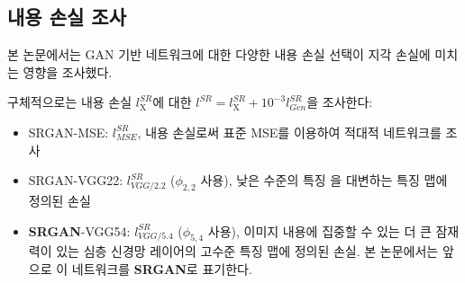 \documentclass[10pt,twocolumn,letterpaper]{article}
\newcommand{\kor}[1]{#1}
\newcommand{\eng}[1]{}
\newcommand{\summary}[1]{}
\begin{document}
\subsection{\eng{Investigation of content loss}\kor{내용 손실 조사}}
\eng{
We investigated the effect of different content loss choices in the perceptual loss for the \ac{GAN}-based networks.
}\kor{
본 논문에서는 \ac{GAN} 기반 네트워크에 대한 다양한 내용 손실 선택이 지각 손실에 미치는 영향을 조사했다.
} \eng{
Specifically we investigate $l^{SR} = l^{SR}_\textrm{X} + 10^{-3}l^{SR}_{Gen}$ for the following content losses $l^{SR}_\textrm{X}$:\\
}\kor{
구체적으로는 내용 손실 $l^{SR}_\textrm{X}$에 대한 $l^{SR} = l^{SR}_\textrm{X} + 10^{-3}l^{SR}_{Gen}$을 조사한다:\\
}
\begin{itemize}
\item \eng{
SRGAN-MSE: $l^{SR}_{MSE}$, to investigate the adversarial network with the standard \ac{MSE} as content loss.
}\kor{
SRGAN-MSE: $l^{SR}_{MSE}$, 내용 손실로써 표준 \ac{MSE}를 이용하여 적대적 네트워크를 조사
}
\item \eng{
SRGAN-VGG22: $l^{SR}_{VGG/2.2}$ with $\phi_{2,2}$, a loss defined on feature maps representing lower-level features \cite{zeiler2014visualizing}.
}\kor{
SRGAN-VGG22: $l^{SR}_{VGG/2.2}$ ($\phi_{2,2}$ 사용), 낮은 수준의 특징 \cite{zeiler2014visualizing}을 대변하는 특징 맵에 정의된 손실
}
\item \eng{
\textbf{SRGAN}-VGG54: $l^{SR}_{VGG/5.4}$ with $\phi_{5,4}$, a loss defined on feature maps of higher level features from deeper network layers with more potential to focus on the content of the images \cite{zeiler2014visualizing,Yosinski2015,Mahendran2016}. We refer to this network as \textbf{SRGAN} in the following.
}\kor{
\textbf{SRGAN}-VGG54: $l^{SR}_{VGG/5.4}$ ($\phi_{5,4}$ 사용), 이미지 내용에 집중할 수 있는 더 큰 잠재력이 있는 심층 신경망 레이어의 고수준 특징 맵에 정의된 손실. 본 논문에서는 앞으로 이 네트워크를 \textbf{SRGAN}로 표기한다.
}
\end{itemize}

\summary{
내용 손실에 따른 지각 손실 영향 조사, SRGAN-MSE, SRGAN-VGG22, SRGAN-VGG54 손실에 대한 설명
}
\end{document}
